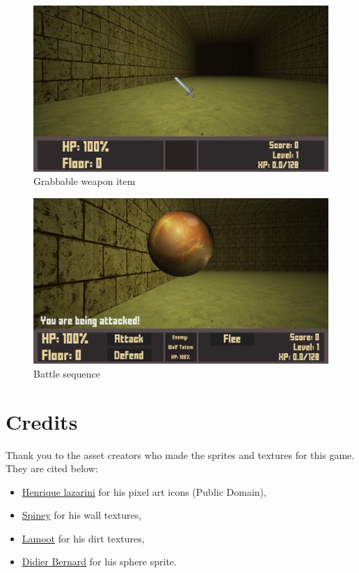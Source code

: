 \documentclass[11pt]{article}
\begin{document}
\begin{figure}[htbp]
\centering
\includegraphics[width=.9\linewidth]{./weapon_item.png}
\caption{Grabbable weapon item}
\end{figure}
\begin{figure}[htbp]
\centering
\includegraphics[width=.9\linewidth]{./versus-enemy.png}
\caption{Battle sequence}
\end{figure}


\section{Credits}
\label{sec:orgb159c77}
Thank you to the asset creators who made the sprites and textures for this game. They are cited below:

\begin{itemize}
\item \href{https://opengameart.org/content/496-pixel-art-icons-for-medievalfantasy-rpg}{Henrique lazarini} for his pixel art icons (Public Domain),
\item \href{https://opengameart.org/content/pietextureset}{Spiney} for his wall textures,
\item \href{https://opengameart.org/content/dirt-003}{Lamoot} for his dirt textures,
\item \href{https://www.deviantart.com/didier-bernard/art/sphere-PNG-version-300364281}{Didier Bernard} for his sphere sprite.
\end{itemize}
\end{document}
